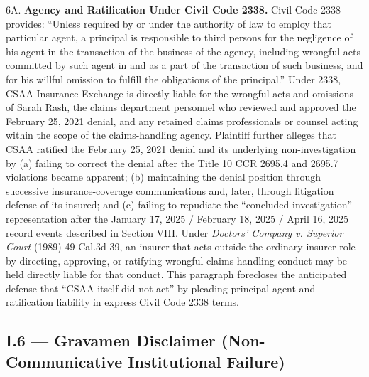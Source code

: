 6A. \textbf{Agency and Ratification Under Civil Code \textsection{} 2338.} Civil Code \textsection{} 2338 provides: ``Unless required by or under the authority of law to employ that particular agent, a principal is responsible to third persons for the negligence of his agent in the transaction of the business of the agency, including wrongful acts committed by such agent in and as a part of the transaction of such business, and for his willful omission to fulfill the obligations of the principal.'' Under \textsection{} 2338, CSAA Insurance Exchange is directly liable for the wrongful acts and omissions of Sarah Rash, the claims department personnel who reviewed and approved the February 25, 2021 denial, and any retained claims professionals or counsel acting within the scope of the claims-handling agency. Plaintiff further alleges that CSAA ratified the February 25, 2021 denial and its underlying non-investigation by (a) failing to correct the denial after the Title 10 CCR \textsection{}\textsection{} 2695.4 and 2695.7 violations became apparent; (b) maintaining the denial position through successive insurance-coverage communications and, later, through litigation defense of its insured; and (c) failing to repudiate the ``concluded investigation'' representation after the January 17, 2025 / February 18, 2025 / April 16, 2025 record events described in Section VIII. Under \emph{Doctors' Company v. Superior Court} (1989) 49 Cal.3d 39, an insurer that acts outside the ordinary insurer role by directing, approving, or ratifying wrongful claims-handling conduct may be held directly liable for that conduct. This paragraph forecloses the anticipated defense that ``CSAA itself did not act'' by pleading principal-agent and ratification liability in express Civil Code \textsection{} 2338 terms.

\subsection{\textsection{}I.6 --- Gravamen Disclaimer (Non-Communicative Institutional Failure)}\label{i.6-gravamen-disclaimer-non-communicative-institutional-failure}

